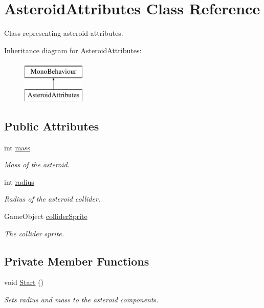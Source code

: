 \hypertarget{class_asteroid_attributes}{}\section{Asteroid\+Attributes Class Reference}
\label{class_asteroid_attributes}


Class representing asteroid attributes.  


Inheritance diagram for Asteroid\+Attributes\+:\begin{figure}[H]
\begin{center}
\leavevmode
\includegraphics[height=2.000000cm]{class_asteroid_attributes}
\end{center}
\end{figure}
\subsection*{Public Attributes}
\begin{DoxyCompactItemize}
\item 
int \mbox{\hyperlink{class_asteroid_attributes_a671f2c91e2ad27a1f1d45346ec8dcd22}{mass}}
\begin{DoxyCompactList}\small\item\em Mass of the asteroid. \end{DoxyCompactList}\item 
int \mbox{\hyperlink{class_asteroid_attributes_a8cc9267ef0f5534260f7ccb7c16c04ca}{radius}}
\begin{DoxyCompactList}\small\item\em Radius of the asteroid collider. \end{DoxyCompactList}\item 
Game\+Object \mbox{\hyperlink{class_asteroid_attributes_a25d09f5bc06ec1aa4761fe4ec30eebca}{collider\+Sprite}}
\begin{DoxyCompactList}\small\item\em The collider sprite. \end{DoxyCompactList}\end{DoxyCompactItemize}
\subsection*{Private Member Functions}
\begin{DoxyCompactItemize}
\item 
void \mbox{\hyperlink{class_asteroid_attributes_a61f24598b995b4629d3426dabb7cfa6a}{Start}} ()
\begin{DoxyCompactList}\small\item\em Sets radius and mass to the asteroid components. \end{DoxyCompactList}\end{DoxyCompactItemize}


